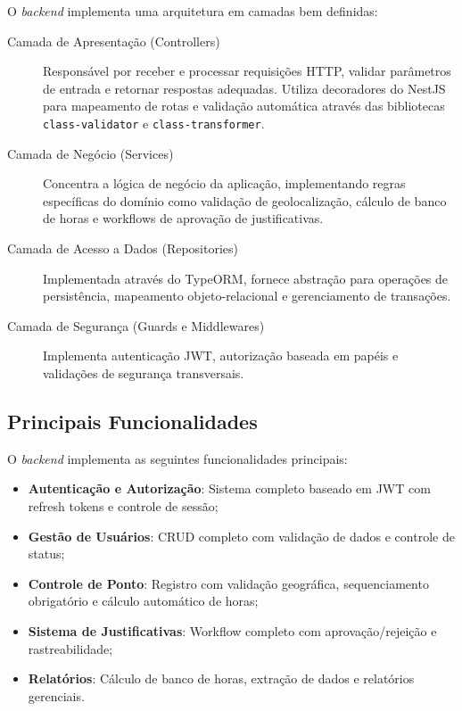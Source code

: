 O \textit{backend} implementa uma arquitetura em camadas bem definidas:

\begin{description}
    \item[Camada de Apresentação (Controllers)] Responsável por receber e processar requisições HTTP, validar parâmetros de entrada e retornar respostas adequadas. Utiliza decoradores do NestJS para mapeamento de rotas e validação automática através das bibliotecas \texttt{class-validator} e \texttt{class-transformer}.
    
    \item[Camada de Negócio (Services)] Concentra a lógica de negócio da aplicação, implementando regras específicas do domínio como validação de geolocalização, cálculo de banco de horas e workflows de aprovação de justificativas.
    
    \item[Camada de Acesso a Dados (Repositories)] Implementada através do TypeORM, fornece abstração para operações de persistência, mapeamento objeto-relacional e gerenciamento de transações.
    
    \item[Camada de Segurança (Guards e Middlewares)] Implementa autenticação JWT, autorização baseada em papéis e validações de segurança transversais.
\end{description}

\subsection{Principais Funcionalidades}

O \textit{backend} implementa as seguintes funcionalidades principais:

\begin{itemize}
    \item \textbf{Autenticação e Autorização}: Sistema completo baseado em JWT com refresh tokens e controle de sessão;
    \item \textbf{Gestão de Usuários}: CRUD completo com validação de dados e controle de status;
    \item \textbf{Controle de Ponto}: Registro com validação geográfica, sequenciamento obrigatório e cálculo automático de horas;
    \item \textbf{Sistema de Justificativas}: Workflow completo com aprovação/rejeição e rastreabilidade;
    \item \textbf{Relatórios}: Cálculo de banco de horas, extração de dados e relatórios gerenciais.
\end{itemize}

